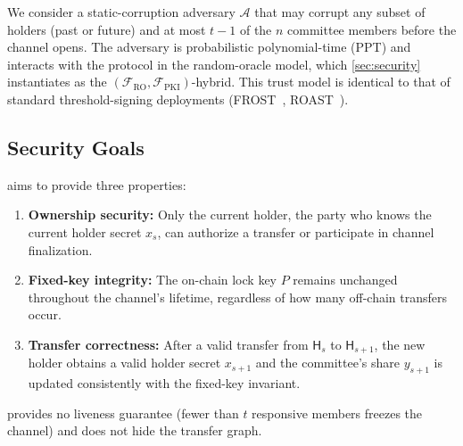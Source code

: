 We consider a static-corruption adversary $\mathcal{A}$ that may corrupt any subset of holders (past or future) and at most $t - 1$ of the $n$ committee members before the channel opens. The adversary is probabilistic polynomial-time (PPT) and interacts with the protocol in the random-oracle model, which \autoref{sec:security} instantiates as the $(\mathcal{F}_{\mathrm{RO}},\mathcal{F}_{\mathrm{PKI}})$-hybrid. This trust model is identical to that of standard threshold-signing deployments (FROST~\cite{komlo2021frost}, ROAST~\cite{ruffing2022roast}).

\subsection{Security Goals}\label{sec:sm-goals}

\thunderbolt aims to provide three properties:

\begin{enumerate}
  \item \textbf{Ownership security:} Only the current holder, the party who knows the current holder secret $x_s$, can authorize a transfer or participate in channel finalization.
  \item \textbf{Fixed-key integrity:} The on-chain lock key $P$ remains unchanged throughout the channel's lifetime, regardless of how many off-chain transfers occur.
  \item \textbf{Transfer correctness:} After a valid transfer from $\mathsf{H}_s$ to $\mathsf{H}_{s+1}$, the new holder obtains a valid holder secret $x_{s+1}$ and the committee's share $y_{s+1}$ is updated consistently with the fixed-key invariant.
\end{enumerate}

\thunderbolt provides no liveness guarantee (fewer than $t$ responsive members freezes the channel) and does not hide the transfer graph.
